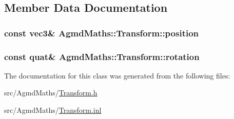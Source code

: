 \subsection{Member Data Documentation}
\hypertarget{class_agmd_maths_1_1_transform_acebb687500339c406d42ad7a98470210}{
\subsubsection[{position}]{\setlength{\rightskip}{0pt plus 5cm}const vec3\& Agmd\+Maths\+::\+Transform\+::position}}\label{class_agmd_maths_1_1_transform_acebb687500339c406d42ad7a98470210}
\hypertarget{class_agmd_maths_1_1_transform_ad6d49103ed9dbf40cc77cb55b024010b}{
\subsubsection[{rotation}]{\setlength{\rightskip}{0pt plus 5cm}const quat\& Agmd\+Maths\+::\+Transform\+::rotation}}\label{class_agmd_maths_1_1_transform_ad6d49103ed9dbf40cc77cb55b024010b}


The documentation for this class was generated from the following files\+:\begin{DoxyCompactItemize}
\item 
src/\+Agmd\+Maths/\hyperlink{_transform_8h}{Transform.\+h}\item 
src/\+Agmd\+Maths/\hyperlink{_transform_8inl}{Transform.\+inl}\end{DoxyCompactItemize}
